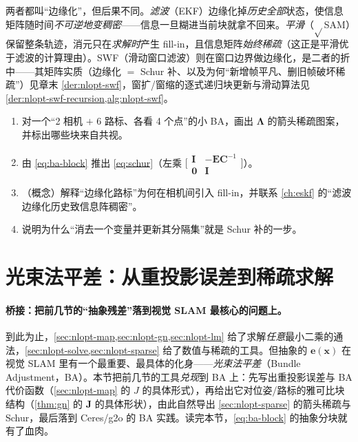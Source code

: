 \begin{pitfall}
两者都叫“边缘化”，但后果不同。\emph{滤波}（EKF）边缘化掉\emph{历史全部}状态，使信息矩阵随时间\emph{不可逆地变稠密}\cite{dellaert2017factor}——信息一旦糊进当前块就拿不回来。\emph{平滑}（$\sqrt{}$SAM）保留整条轨迹，消元只在\emph{求解时}产生 fill-in，且信息矩阵\emph{始终稀疏}（这正是平滑优于滤波的计算理由）。SWF（滑动窗口滤波）则在窗口边界做边缘化，是二者的折中——其矩阵实质（边缘化 $=$ Schur 补、以及为何“新增帧平凡、删旧帧破坏稀疏”）见章末 \cref{der:nlopt-swf}，窗扩/窗缩的逐式递归块更新与滑动算法见 \cref{der:nlopt-swf-recursion,alg:nlopt-swf}。
\end{pitfall}

\begin{practice}
\begin{enumerate}
  \item 对一个“2 相机 $+$ 6 路标、各看 4 个点”的小 BA，画出 $\boldsymbol{\Lambda}$ 的箭头稀疏图案，并标出哪些块来自共视。
  \item 由 \cref{eq:ba-block} 推出 \cref{eq:schur}（左乘 $\big[\begin{smallmatrix}\mathbf{I}&-\mathbf{E}\mathbf{C}^{-1}\\\mathbf{0}&\mathbf{I}\end{smallmatrix}\big]$）。
  \item （概念）解释“边缘化路标”为何在相机间引入 fill-in，并联系 \cref{ch:eskf} 的“滤波边缘化历史致信息阵稠密”。
  \item 说明为什么“消去一个变量并更新其分隔集”就是 Schur 补的一步。
\end{enumerate}
\end{practice}

\section{光束法平差：从重投影误差到稀疏求解}
\label{sec:nlopt-ba}

\paragraph{桥接：把前几节的“抽象残差”落到视觉 SLAM 最核心的问题上。}
到此为止，\cref{sec:nlopt-map,sec:nlopt-gn,sec:nlopt-lm} 给了求解\emph{任意}最小二乘的通法，\cref{sec:nlopt-solve,sec:nlopt-sparse} 给了数值与稀疏的工具。但抽象的 $\mathbf{e}(\mathbf{x})$ 在视觉 SLAM 里有一个最重要、最具体的化身\cite{gaoxiang2019slam14}——\emph{光束法平差}（Bundle Adjustment，BA）。本节把前几节的工具\emph{兑现}到 BA 上：先写出重投影误差与 BA 代价函数（\cref{sec:nlopt-map} 的 $J$ 的具体形式），再给出它对位姿/路标的雅可比块结构（\cref{thm:gn} 的 $\mathbf{J}$ 的具体形状），由此自然导出 \cref{sec:nlopt-sparse} 的箭头稀疏与 Schur，最后落到 Ceres/g2o 的 BA 实践。读完本节，\cref{eq:ba-block} 的抽象分块就有了血肉。

